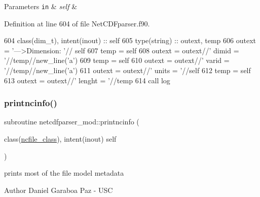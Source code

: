 \begin{DoxyParams}[1]{Parameters}
\mbox{\tt in}  & {\em self} & \\
\hline
\end{DoxyParams}


Definition at line 604 of file Net\+C\+D\+Fparser.\+f90.


\begin{DoxyCode}
604     \textcolor{keywordtype}{class}(dim\_t), \textcolor{keywordtype}{intent(inout)} :: self
605     \textcolor{keywordtype}{type}(string) :: outext, temp
606     outext = \textcolor{stringliteral}{'--->Dimension: '}// self%
607     temp = self%
608     outext = outext//\textcolor{stringliteral}{'       dimid = '}//temp//new\_line(\textcolor{stringliteral}{'a'})
609     temp = self%
610     outext = outext//\textcolor{stringliteral}{'       varid = '}//temp//new\_line(\textcolor{stringliteral}{'a'})
611     outext = outext//\textcolor{stringliteral}{'       units = '}//self%
612     temp = self%
613     outext = outext//\textcolor{stringliteral}{'       lenght = '}//temp
614     \textcolor{keyword}{call }log%
\end{DoxyCode}
\mbox{\label{namespacenetcdfparser__mod_aeb48d33c014bae21b2fceaaa70cbdc67}} 
\subsubsection{\texorpdfstring{printncinfo()}{printncinfo()}}
{\footnotesize\ttfamily subroutine netcdfparser\+\_\+mod\+::printncinfo (\begin{DoxyParamCaption}\item[{class(\mbox{\hyperlink{structnetcdfparser__mod_1_1ncfile__class}{ncfile\+\_\+class}}), intent(inout)}]{self }\end{DoxyParamCaption})\hspace{0.3cm}{\ttfamily [private]}}



prints most of the file model metadata 

\begin{DoxyAuthor}{Author}
Daniel Garaboa Paz -\/ U\+SC 
\end{DoxyAuthor}

